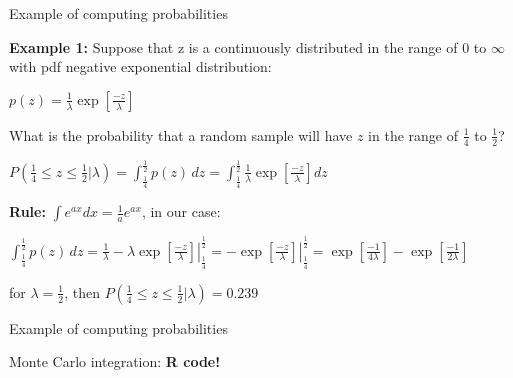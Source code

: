 \documentclass{beamer}
\begin{document}
\begin{frame}{Example of computing probabilities}

  \textbf{Example 1:} Suppose that z is a continuously distributed in the range of $0$ to $\infty$ with pdf negative exponential distribution:
  \vspace{0.2cm} 
   
  $p(z) = \frac{1}{\lambda} \exp\left[\frac{-z}{\lambda}\right]$  
  \vspace{0.2cm} 
  
  What is the probability that a random sample will have $z$ in the range of $\frac{1}{4}$ to $\frac{1}{2}$?
  
  $P(\frac{1}{4} \leq z \leq \frac{1}{2} | \lambda) = \int_{\frac{1}{4}}^{\frac{1}{2}} p(z)\, dz = \int_{\frac{1}{4}}^{\frac{1}{2}} \frac{1}{\lambda} \exp\left[{\frac{-z}{\lambda}}\right] dz$  
  \vspace{0.2cm}
  
  \textbf{Rule:} $\int e^{ax} dx = \frac{1}{a} e^{ax}$, in our case:
  
  \vspace{0.2cm} 

  
  $\int_{\frac{1}{4}}^{\frac{1}{2}} p(z)\, dz = \left.\frac{1}{\lambda} - \lambda \exp\left[\frac{-z}{\lambda}\right]\right|_{\frac{1}{4}}^{\frac{1}{2}} = \left. - \exp\left[\frac{-z}{\lambda}  \right] \right|_{\frac{1}{4}}^{\frac{1}{2}} = \exp\left[\frac{-1}{4\lambda} \right] - \exp\left[\frac{-1}{2\lambda} \right]$
 \vspace{0.2cm}

 for $\lambda = \frac{1}{2}$, then $P(\frac{1}{4} \leq z \leq \frac{1}{2} | \lambda) = 0.239$

\end{frame}


\begin{frame}{Example of computing probabilities}

Monte Carlo integration: \textbf{R code!}
  
\end{frame}

\end{document}
